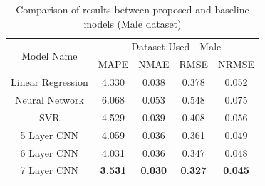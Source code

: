 \begin{table}[]
\centering
\vspace{1ex}
\caption{Comparison of results between proposed and baseline models (Male dataset)}
\label{malecomp}
\begin{tabular}{|c|c|c|c|c|}
\hline
\multirow{2}{*}{Model Name} & \multicolumn{4}{c|}{Dataset Used - Male}                                                                       \\ \cline{2-5} 
                            & \multicolumn{1}{l|}{MAPE} & \multicolumn{1}{l|}{NMAE} & \multicolumn{1}{l|}{RMSE} & \multicolumn{1}{l|}{NRMSE} \\ \hline
Linear Regression            & 4.330                     & 0.038                     & 0.378                     & 0.052                      \\ \hline
Neural Network              & 6.068                     & 0.053                     & 0.548                     & 0.075                      \\ \hline
SVR                         & 4.529                     & 0.039                     & 0.408                     & 0.056                      \\ \hline
5 Layer CNN                 & 4.059                     & 0.036                     & 0.361                     & 0.049                      \\ \hline
6 Layer CNN                 & 4.031                     & 0.036                     & 0.347                     & 0.048                      \\ \hline
7 Layer CNN                 & \textbf{3.531}            & \textbf{0.030}            & \textbf{0.327}            & \textbf{0.045}             \\ \hline
\end{tabular}
\end{table}




